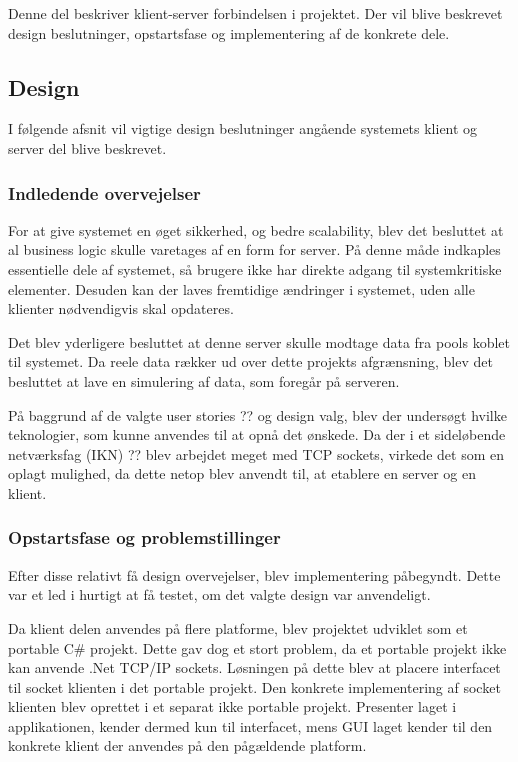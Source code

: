 Denne del beskriver klient-server forbindelsen i projektet. Der vil blive beskrevet design beslutninger, opstartsfase og implementering af de konkrete dele.

\subsection{Design}
I følgende afsnit vil vigtige design beslutninger angående systemets klient og server del blive beskrevet. 

\subsubsection{Indledende overvejelser}
For at give systemet en øget sikkerhed, og bedre scalability, blev det besluttet at al business logic skulle varetages af en form for server. På denne måde indkaples essentielle dele af systemet, så brugere ikke har direkte adgang til systemkritiske elementer. Desuden kan der laves fremtidige ændringer i systemet, uden alle klienter nødvendigvis skal opdateres.

Det blev yderligere besluttet at denne server skulle modtage data fra pools koblet til systemet. Da reele data rækker ud over dette projekts afgrænsning, blev det besluttet at lave en simulering af data, som foregår på serveren.

På baggrund af de valgte user stories ?? og design valg, blev der undersøgt hvilke teknologier, som kunne anvendes til at opnå det ønskede. Da der i et sideløbende netværksfag (IKN) ?? blev arbejdet meget med TCP sockets, virkede det som en oplagt mulighed, da dette netop blev anvendt til, at etablere en server og en klient.

\subsubsection{Opstartsfase og problemstillinger}
Efter disse relativt få design overvejelser, blev implementering påbegyndt. Dette var et led i hurtigt at få testet, om det valgte design var anvendeligt. 

Da klient delen anvendes på flere platforme, blev projektet udviklet som et portable C\# projekt. Dette gav dog et stort problem, da et portable projekt ikke kan anvende .Net TCP/IP sockets. Løsningen på dette blev at placere interfacet til socket klienten i det portable projekt. Den konkrete implementering af socket klienten blev oprettet i et separat ikke portable projekt. Presenter laget i applikationen, kender dermed kun til interfacet, mens GUI laget kender til den konkrete klient der anvendes på den pågældende platform.

